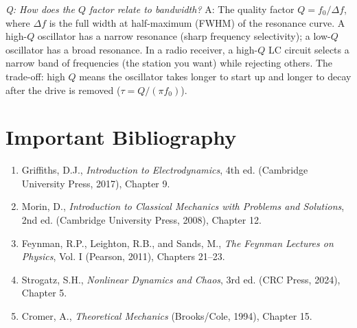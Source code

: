 \textit{Q: How does the $Q$ factor relate to bandwidth?}
A: The quality factor $Q = f_0/\Delta f$, where $\Delta f$ is the full width at half-maximum (FWHM) of the resonance curve. A high-$Q$ oscillator has a narrow resonance (sharp frequency selectivity); a low-$Q$ oscillator has a broad resonance. In a radio receiver, a high-$Q$ LC circuit selects a narrow band of frequencies (the station you want) while rejecting others. The trade-off: high $Q$ means the oscillator takes longer to start up and longer to decay after the drive is removed ($\tau = Q/(\pi f_0)$).
\section*{Important Bibliography}
\begin{enumerate}
\item Griffiths, D.J., \textit{Introduction to Electrodynamics}, 4th ed. (Cambridge University Press, 2017), Chapter 9.
\item Morin, D., \textit{Introduction to Classical Mechanics with Problems and Solutions}, 2nd ed. (Cambridge University Press, 2008), Chapter 12.
\item Feynman, R.P., Leighton, R.B., and Sands, M., \textit{The Feynman Lectures on Physics}, Vol. I (Pearson, 2011), Chapters 21--23.
\item Strogatz, S.H., \textit{Nonlinear Dynamics and Chaos}, 3rd ed. (CRC Press, 2024), Chapter 5.
\item Cromer, A., \textit{Theoretical Mechanics} (Brooks/Cole, 1994), Chapter 15.
\end{enumerate}

